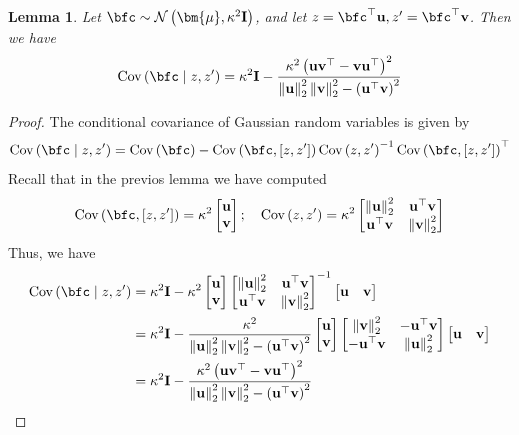 \documentclass[10pt]{article} %
\newtheorem{lemma}[theorem]{Lemma}
\theoremstyle{definition}
\theoremstyle{plain}
\newcommand{\paren}[1]{\left(#1\right)}
\newcommand{\norm}[1]{\left\|#1\right\|}
\def\bfI{{\mathbf{I}}}\def\bfJ{{\mathbf{J}}}\def\bfK{{\mathbf{K}}}\def\bfL{{\mathbf{L}}}
\def\bfu{{\mathbf{u}}}\def\bfv{{\mathbf{v}}}\def\bfw{{\mathbf{w}}}\def\bfx{{\mathbf{x}}}
\begin{document}
\begin{lemma}
    \label{lem:conditional_cov}
    Let $\bfc\sim\mathcal{N}\paren{\bm{\mu},\kappa^2\bfI}$, and let $z = \bfc^\top\bfu, z' = \bfc^\top\bfv$. Then we have
    \[
        \text{Cov}\paren{\bfc\mid z, z'} = \kappa^2\bfI - \frac{\kappa^2\paren{\bfu\bfv^\top - \bfv\bfu^\top}^2}{\norm{\bfu}_2^2\norm{\bfv}_2^2 - \paren{\bfu^\top\bfv}^2}
    \]
\end{lemma}
\begin{proof}
    The conditional covariance of Gaussian random variables is given by
    \[
        \text{Cov}\paren{\bfc\mid z, z'} = \text{Cov}\paren{\bfc} -  \text{Cov}\paren{\bfc,[z, z']}\text{Cov}\paren{z, z'}^{-1}\text{Cov}\paren{\bfc,[z, z']}^\top
    \]
    Recall that in the previos lemma we have computed
    \begin{align*}
        \text{Cov}\paren{\bfc,[z, z']} = \kappa^2\begin{bmatrix}
                \bfu\\
                \bfv
            \end{bmatrix}; \quad \text{Cov}\paren{z, z'} = \kappa^2\begin{bmatrix}
                \norm{\bfu}_2^2 & \bfu^\top\bfv\\
                \bfu^\top\bfv& \norm{\bfv}_2^2 
            \end{bmatrix}
    \end{align*}
    Thus, we have
    \begin{align*}
        \text{Cov}\paren{\bfc\mid z, z'} & = \kappa^2\bfI - \kappa^2\begin{bmatrix}
                \bfu\\
                \bfv
            \end{bmatrix}\begin{bmatrix}
                \norm{\bfu}_2^2 & \bfu^\top\bfv\\
                \bfu^\top\bfv& \norm{\bfv}_2^2 
            \end{bmatrix}^{-1}\begin{bmatrix}
                \bfu & 
                \bfv
            \end{bmatrix}\\
            & = \kappa^2\bfI - \frac{\kappa^2}{\norm{\bfu}_2^2\norm{\bfv}_2^2- \paren{\bfu^\top\bfv}^2}\begin{bmatrix}
                \bfu\\
                \bfv
            \end{bmatrix}\begin{bmatrix}
                \norm{\bfv}_2^2 & -\bfu^\top\bfv\\
                -\bfu^\top\bfv& \norm{\bfu}_2^2 
            \end{bmatrix}\begin{bmatrix}
                \bfu & 
                \bfv
            \end{bmatrix}\\
            & = \kappa^2\bfI - \frac{\kappa^2\paren{\bfu\bfv^\top - \bfv\bfu^\top}^2}{\norm{\bfu}_2^2\norm{\bfv}_2^2 - \paren{\bfu^\top\bfv}^2}
    \end{align*}
\end{proof}
\end{document}

